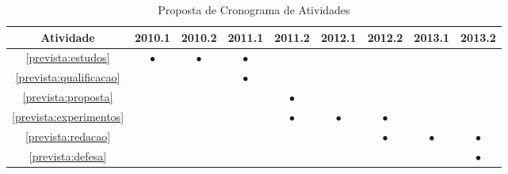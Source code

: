 \documentclass{article}
\newcommand{\newrow}{\\\hline}
\newcommand{\x}{$\bullet$}
\begin{document}
\begin{table}[h]
  \centering
  \begin{tabular}{|c|c|c|c|c|c|c|c|c|} \hline
    Atividade                   & 2010.1 & 2010.2 & 2011.1 & 2011.2  & 2012.1 & 2012.2  & 2013.1 & 2013.2 \newrow
    \ref{prevista:estudos}      & \x     & \x     & \x     &         &        &         &        &        \newrow
    \ref{prevista:qualificacao} &        &        & \x     &         &        &         &        &        \newrow
    \ref{prevista:proposta}     &        &        &        & \x      &        &         &        &        \newrow
    \ref{prevista:experimentos} &        &        &        & \x      & \x     & \x      &        &        \newrow
    \ref{prevista:redacao}      &        &        &        &         &        & \x      & \x     & \x     \newrow
    \ref{prevista:defesa}       &        &        &        &         &        &         &        & \x     \newrow
  \end{tabular}
 \caption{Proposta de Cronograma de Atividades}
 \label{tab:cronograma}
\end{table}




\end{document}
